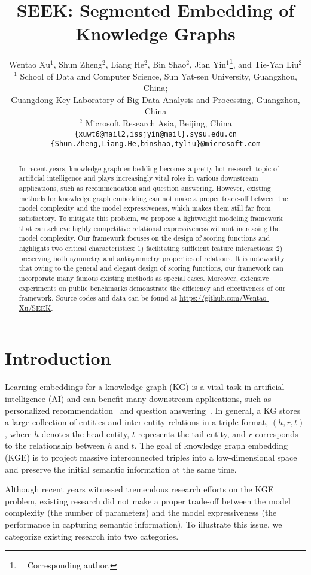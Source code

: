 \documentclass[11pt,a4paper]{article}
\title{SEEK: Segmented Embedding of Knowledge Graphs}
\author{Wentao  Xu$^1$, Shun Zheng$^2$, Liang He$^2$, Bin Shao$^2$, Jian Yin$^1$\thanks{\ \ Corresponding author.}, and Tie-Yan Liu$^2$\\
  $^1$ School of Data and Computer Science, Sun Yat-sen University, Guangzhou, China;\\
  Guangdong Key Laboratory of Big Data Analysis and Processing, Guangzhou, China\\
  $^2$ Microsoft Research Asia, Beijing, China \\
  \texttt{\{xuwt6@mail2,issjyin@mail\}.sysu.edu.cn} \\
  \texttt{\{Shun.Zheng,Liang.He,binshao,tyliu\}@microsoft.com} \\
}
\date{}
\begin{document}
\maketitle

\begin{abstract}
In recent years, knowledge graph embedding becomes a pretty hot research topic of artificial intelligence and plays increasingly vital roles in various downstream applications, such as recommendation and question answering.
However, existing methods for knowledge graph embedding can not make a proper trade-off between the model complexity and the model expressiveness, which makes them still far from satisfactory.
To mitigate this problem, we propose a lightweight modeling framework that can achieve highly competitive relational expressiveness without increasing the model complexity.
Our framework focuses on the design of scoring functions and highlights two critical characteristics:
1) facilitating sufficient feature interactions; 
2) preserving both symmetry and antisymmetry properties of relations.
It is noteworthy that owing to the general and elegant design of scoring functions, our framework can incorporate many famous existing methods as special cases.
Moreover, extensive experiments on public benchmarks demonstrate the efficiency and effectiveness of our framework.
Source codes and data can be found at \url{https://github.com/Wentao-Xu/SEEK}.
\end{abstract}
 \section{Introduction}
\label{sec:intro}

Learning embeddings for a knowledge graph (KG) is a vital task in artificial intelligence (AI) and can benefit many downstream applications, such as personalized recommendation~\cite{zhang2016collaborative,wang2018dkn} and question answering~\cite{huang2019knowledge}.
In general, a KG stores a large collection of entities and inter-entity relations in a triple format, $(h, r, t)$, where $h$ denotes the \underline{h}ead entity, $t$ represents the \underline{t}ail entity, and $r$ corresponds to the relationship between $h$ and $t$. 
The goal of knowledge graph embedding (KGE) is to project massive interconnected triples into a low-dimensional space and preserve the initial semantic information at the same time.

Although recent years witnessed tremendous research efforts on the KGE problem, existing research did not make a proper trade-off between the model complexity (the number of parameters) and the model expressiveness (the performance in capturing semantic information).
To illustrate this issue, we categorize existing research into two categories.
\end{document}

